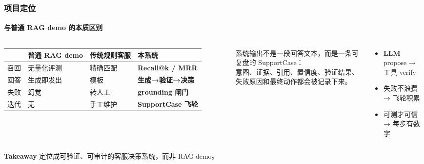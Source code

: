 \documentclass[aspectratio=169,10pt]{beamer}
\newcommand{\takeaway}[1]{%
  \vfill%
  \begin{tcolorbox}[
    colback=Ctakebg, colframe=Ctakebg,
    arc=0pt, boxrule=0pt,
    left=7pt, right=7pt, top=4pt, bottom=4pt,
    width=\textwidth, nobeforeafter
  ]%
    {\scriptsize\color{white}\textbf{Takeaway}\enspace%
     \color{white!88!Ctakebg}#1}%
  \end{tcolorbox}%
}
\newcommand{\hi}[1]{{\bfseries\color{Cgreen}#1}}      %
\newcommand{\mono}[1]{{\ttfamily\small\color{Cblue!90!black}#1}}  %
\begin{document}
\begin{frame}
\frametitle{项目定位}
\framesubtitle{与普通 RAG demo 的本质区别}

\begin{columns}[T]
{\small
\begin{tabularx}{\linewidth}{lXXX}
\toprule
& {\color{Cmuted}普通 RAG demo} & {\color{Cmuted}传统规则客服} & {\bfseries\color{Cblue}本系统} \\
\midrule
\rowcolor{Cgraylt}
召回 & 无量化评测 & 精确匹配 & \hi{Recall@k / MRR} \\
回答 & 生成即发出 & 模板 & \hi{生成→验证→决策} \\
\rowcolor{Cgraylt}
失败 & 幻觉 & 转人工 & \hi{grounding 闸门} \\
迭代 & 无 & 手工维护 & \hi{SupportCase 飞轮} \\
\bottomrule
\end{tabularx}}

\vspace{0.2cm}
\begin{tcolorbox}[tcblue]
\small 系统输出不是一段回答文本，而是一条可复盘的 \mono{SupportCase}：\\
意图、证据、引用、置信度、验证结果、失败原因和最终动作都会被记录下来。
\end{tcolorbox}

\begin{tcolorbox}[tcgray, title={\color{Ctextdark}三条设计原则}]
\small
\begin{itemize}\setlength\itemsep{0.3em}
  \item \textbf{LLM} propose → 工具 verify
  \item 失败不浪费 → 飞轮积累
  \item 可测才可信 → 每步有数字
\end{itemize}
\end{tcolorbox}
\end{columns}

\takeaway{定位成可验证、可审计的客服决策系统，而非 RAG demo。}
\end{frame}
\end{document}
